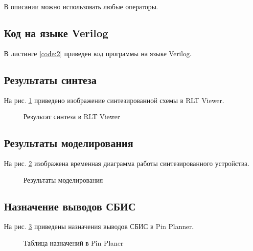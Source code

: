 В описании можно использовать любые операторы.

\subsection{Код на языке Verilog}

В листинге \ref{code:2} приведен код программы на языке Verilog.

%

\subsection{Результаты синтеза}

На рис. \ref{fig:lab4_2_rtl} приведено изображение синтезированной схемы в RLT Viewer.

\begin{figure}[H]
\begin{center}
	\caption{Результат синтеза в RLT Viewer}
	\label{fig:lab4_2_rtl}
\end{center}
\end{figure}

\subsection{Результаты моделирования}
\label{sec:lab4_2_modeling}

На рис. \ref{fig:lab4_2_modeling} изображена временная диаграмма работы синтезированного устройства.

\begin{figure}[H]
\begin{center}
	\caption{Результаты моделирования}
	\label{fig:lab4_2_modeling}
\end{center}
\end{figure}

\subsection{Назначение выводов СБИС}

На рис. \ref{fig:lab4_2_pins} приведены назначения выводов СБИС в Pin Planner.

\begin{figure}[H]
\begin{center}
	\caption{Таблица назначений в Pin Planer}
	\label{fig:lab4_2_pins}
\end{center}
\end{figure}

